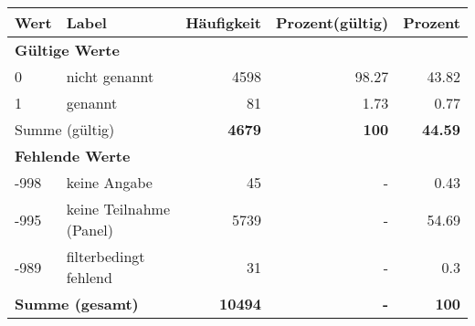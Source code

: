      \begin{longtable}{lXrrr}
     \toprule
     \textbf{Wert} & \textbf{Label} & \textbf{Häufigkeit} & \textbf{Prozent(gültig)} & \textbf{Prozent} \\
     \endhead
     \midrule
     \multicolumn{5}{l}{\textbf{Gültige Werte}}\\

     0 &
     \multicolumn{1}{X}{ nicht genannt   } &


       \num{4598} &
       \num[round-mode=places,round-precision=2]{98.27} &
         \num[round-mode=places,round-precision=2]{43.82} \\

     1 &
     \multicolumn{1}{X}{ genannt   } &


       \num{81} &
       \num[round-mode=places,round-precision=2]{1.73} &
         \num[round-mode=places,round-precision=2]{0.77} \\
     \midrule
     \multicolumn{2}{l}{Summe (gültig)} &
       \textbf{\num{4679}} &
     \textbf{\num{100}} &
       \textbf{\num[round-mode=places,round-precision=2]{44.59}} \\
     \multicolumn{5}{l}{\textbf{Fehlende Werte}}\\
       -998 &
       keine Angabe &
         \num{45} &
        - &
         \num[round-mode=places,round-precision=2]{0.43} \\
       -995 &
       keine Teilnahme (Panel) &
         \num{5739} &
        - &
         \num[round-mode=places,round-precision=2]{54.69} \\
       -989 &
       filterbedingt fehlend &
         \num{31} &
        - &
         \num[round-mode=places,round-precision=2]{0.3} \\
     \midrule
     \multicolumn{2}{l}{\textbf{Summe (gesamt)}} &
          \textbf{\num{10494}} &
        \textbf{-} &
        \textbf{\num{100}} \\
     \bottomrule
     \end{longtable}
     
